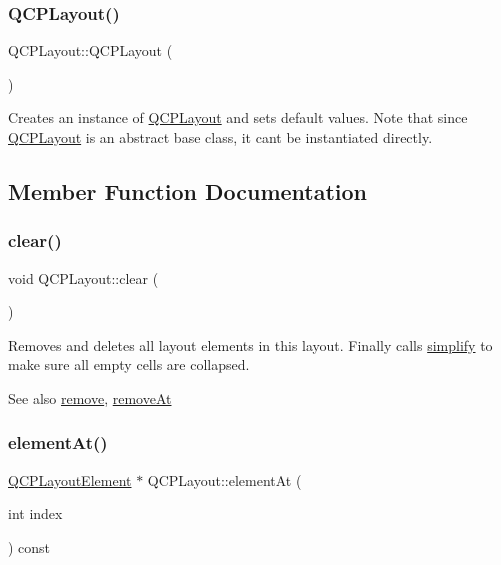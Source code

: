 \subsubsection{\texorpdfstring{Q\+C\+P\+Layout()}{QCPLayout()}}
{\footnotesize\ttfamily Q\+C\+P\+Layout\+::\+Q\+C\+P\+Layout (\begin{DoxyParamCaption}{ }\end{DoxyParamCaption})\hspace{0.3cm}{\ttfamily [explicit]}}

Creates an instance of \mbox{\hyperlink{class_q_c_p_layout}{Q\+C\+P\+Layout}} and sets default values. Note that since \mbox{\hyperlink{class_q_c_p_layout}{Q\+C\+P\+Layout}} is an abstract base class, it can\textquotesingle{}t be instantiated directly. 

\subsection{Member Function Documentation}
\mbox{\label{class_q_c_p_layout_a02883bdf2769b5b227f0232dba1ac4ee}} 
\subsubsection{\texorpdfstring{clear()}{clear()}}
{\footnotesize\ttfamily void Q\+C\+P\+Layout\+::clear (\begin{DoxyParamCaption}{ }\end{DoxyParamCaption})}

Removes and deletes all layout elements in this layout. Finally calls \mbox{\hyperlink{class_q_c_p_layout_a41e6ac049143866e8f8b4964efab01b2}{simplify}} to make sure all empty cells are collapsed.

\begin{DoxySeeAlso}{See also}
\mbox{\hyperlink{class_q_c_p_layout_a6c58f537d8086f352576ab7c5b15d0bc}{remove}}, \mbox{\hyperlink{class_q_c_p_layout_a2403f684fee3ce47132faaeed00bb066}{remove\+At}} 
\end{DoxySeeAlso}
\mbox{\label{class_q_c_p_layout_afa73ca7d859f8a3ee5c73c9b353d2a56}} 
\subsubsection{\texorpdfstring{element\+At()}{elementAt()}}
{\footnotesize\ttfamily \mbox{\hyperlink{class_q_c_p_layout_element}{Q\+C\+P\+Layout\+Element}} $\ast$ Q\+C\+P\+Layout\+::element\+At (\begin{DoxyParamCaption}\item[{int}]{index }\end{DoxyParamCaption}) const\hspace{0.3cm}{\ttfamily [pure virtual]}}

